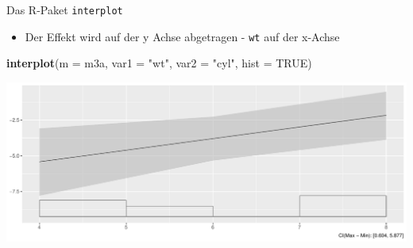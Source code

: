 \documentclass[ignorenonframetext,]{beamer}
\newenvironment{Shaded}{\begin{snugshade}}{\end{snugshade}}
\newcommand{\KeywordTok}[1]{\textcolor[rgb]{0.13,0.29,0.53}{\textbf{#1}}}
\newcommand{\DataTypeTok}[1]{\textcolor[rgb]{0.13,0.29,0.53}{#1}}
\newcommand{\StringTok}[1]{\textcolor[rgb]{0.31,0.60,0.02}{#1}}
\newcommand{\OtherTok}[1]{\textcolor[rgb]{0.56,0.35,0.01}{#1}}
\newcommand{\NormalTok}[1]{#1}
\providecommand{\tightlist}{%
  \setlength{\itemsep}{0pt}\setlength{\parskip}{0pt}}
\begin{document}
\begin{frame}[fragile]{Das R-Paket \texttt{interplot}}

\begin{itemize}
\tightlist
\item
  Der Effekt wird auf der y Achse abgetragen - \texttt{wt} auf der
  x-Achse
\end{itemize}

\begin{Shaded}
\begin{Highlighting}[]
\KeywordTok{interplot}\NormalTok{(}\DataTypeTok{m =}\NormalTok{ m3a, }\DataTypeTok{var1 =} \StringTok{"wt"}\NormalTok{, }\DataTypeTok{var2 =} \StringTok{"cyl"}\NormalTok{, }\DataTypeTok{hist =} \OtherTok{TRUE}\NormalTok{)  }
\end{Highlighting}
\end{Shaded}

\includegraphics{B3_linreg_files/figure-beamer/unnamed-chunk-19-1.pdf}

\end{frame}
\end{document}
